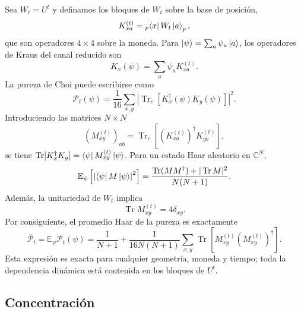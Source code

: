 Sea $W_t=U^t$ y definamos los bloques de $W_t$ sobre la base de posición,
\begin{equation}
    K_{xa}^{(t)}
    =
    {}_p\!\bra{x}W_t\ket{a}_p,
\end{equation}
que son operadores $4\times4$ sobre la moneda. Para
$\ket{\psi}=\sum_a\psi_a\ket{a}$, los operadores de Kraus del canal
reducido son
\begin{equation}
    K_x(\psi)=\sum_a\psi_a K_{xa}^{(t)}.
\end{equation}
La pureza de Choi puede escribirse como
\begin{equation}
    \mathcal P_t(\psi)
    =
    \frac{1}{16}
    \sum_{x,y}
    \left|
        \operatorname{Tr}_c
        \left[K_x^\dagger(\psi)K_y(\psi)\right]
    \right|^2.
    \label{eq:ChoiPurityKraus}
\end{equation}
Introduciendo las matrices $N\times N$
\begin{equation}
    (M_{xy}^{(t)})_{ab}
    =
    \operatorname{Tr}_c
    \left[
        (K_{xa}^{(t)})^\dagger K_{yb}^{(t)}
    \right],
\end{equation}
se tiene
$\operatorname{Tr}[K_x^\dagger K_y]
=\bra{\psi}M_{xy}^{(t)}\ket{\psi}$.
Para un estado Haar aleatorio en $\mathbb C^N$,
\begin{equation}
    \mathbb E_{\psi}
    \left[
        \left|\bra{\psi}M\ket{\psi}\right|^2
    \right]
    =
    \frac{
        \operatorname{Tr}(MM^\dagger)
        +|\operatorname{Tr}M|^2
    }{N(N+1)}.
\end{equation}
Además, la unitariedad de $W_t$ implica
\begin{equation}
    \operatorname{Tr}M_{xy}^{(t)}
    =
    4\delta_{xy}.
\end{equation}
Por consiguiente, el promedio Haar de la pureza es exactamente
\begin{equation}
    \boxed{
    \overline{\mathcal P}_t
    =
    \mathbb E_{\psi}\mathcal P_t(\psi)
    =
    \frac{1}{N+1}
    +
    \frac{1}{16N(N+1)}
    \sum_{x,y}
    \operatorname{Tr}
    \left[
        M_{xy}^{(t)}(M_{xy}^{(t)})^\dagger
    \right].
    }
    \label{eq:HaarAverageChoiPurity}
\end{equation}
Esta expresión es exacta para cualquier geometría, moneda y tiempo; toda
la dependencia dinámica está contenida en los bloques de $U^t$.

\subsection{Concentración}

